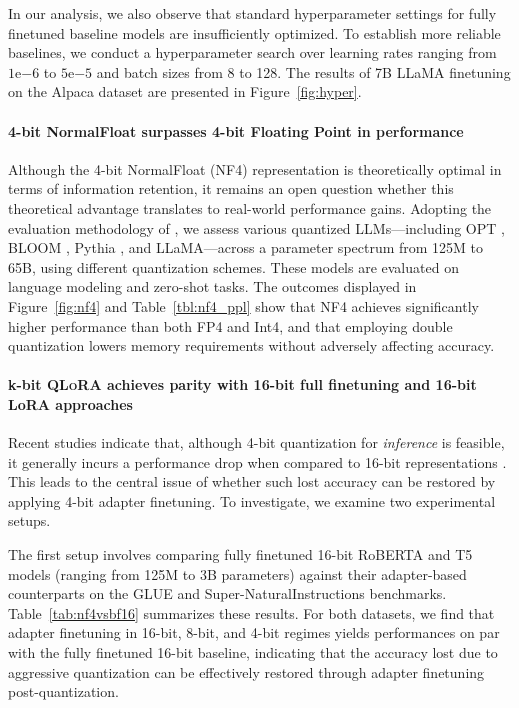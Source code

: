 In our analysis, we also observe that standard hyperparameter settings for fully finetuned baseline models are insufficiently optimized. To establish more reliable baselines, we conduct a hyperparameter search over learning rates ranging from $1\mathrm{e}{-6}$ to $5\mathrm{e}{-5}$ and batch sizes from 8 to 128. The results of 7B LLaMA finetuning on the Alpaca dataset are presented in Figure~\ref{fig:hyper}.

\paragraph{4-bit NormalFloat surpasses 4-bit Floating Point in performance}

Although the 4-bit NormalFloat (NF4) representation is theoretically optimal in terms of information retention, it remains an open question whether this theoretical advantage translates to real-world performance gains. Adopting the evaluation methodology of \citet{dettmers2022case}, we assess various quantized LLMs—including OPT \citep{zhang2022opt}, BLOOM \cite{scao2022bloom}, Pythia \cite{biderman2023pythia}, and LLaMA—across a parameter spectrum from 125M to 65B, using different quantization schemes. These models are evaluated on language modeling and zero-shot tasks. The outcomes displayed in Figure~\ref{fig:nf4} and Table~\ref{tbl:nf4_ppl} show that NF4 achieves significantly higher performance than both FP4 and Int4, and that employing double quantization lowers memory requirements without adversely affecting accuracy.

\paragraph{k-bit \textsc{QLoRA} achieves parity with 16-bit full finetuning and 16-bit LoRA approaches}

Recent studies indicate that, although 4-bit quantization for \emph{inference} is feasible, it generally incurs a performance drop when compared to 16-bit representations \citep{dettmers2022case,frantar2022gptq}. This leads to the central issue of whether such lost accuracy can be restored by applying 4-bit adapter finetuning. To investigate, we examine two experimental setups.

The first setup involves comparing fully finetuned 16-bit RoBERTA and T5 models (ranging from 125M to 3B parameters) against their adapter-based counterparts on the GLUE and Super-NaturalInstructions benchmarks. Table~\ref{tab:nf4vsbf16} summarizes these results. For both datasets, we find that adapter finetuning in 16-bit, 8-bit, and 4-bit regimes yields performances on par with the fully finetuned 16-bit baseline, indicating that the accuracy lost due to aggressive quantization can be effectively restored through adapter finetuning post-quantization.

